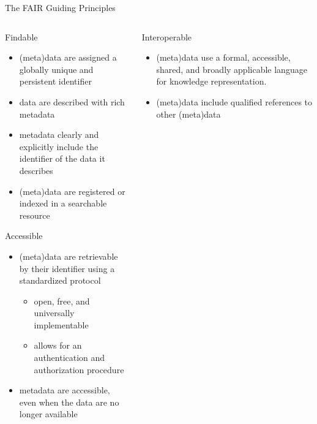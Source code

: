 \documentclass[ignorenonframetext,aspectratio=169,10pt,xcolor=table]{beamer}
\begin{document}
\begin{frame}{The FAIR Guiding Principles}
  \begin{columns} \small
    \begin{column}{0.5\textwidth}
  \begin{block}{Findable}
    \begin{itemize}
    \item (meta)data are assigned a globally unique and persistent identifier
    \item data are described with rich metadata 
    \item metadata clearly and explicitly include the identifier of the data it describes
    \item (meta)data are registered or indexed in a searchable resource
    \end{itemize}
  \end{block}

  \begin{block}{Accessible}
    \begin{itemize}
    \item (meta)data are retrievable by their identifier using a standardized protocol
      \begin{itemize}
      \item  open, free, and universally implementable
      \item  allows for an authentication and authorization procedure
      \end{itemize}
    \item metadata are accessible, even when the data are no longer available
    \end{itemize}
  \end{block}
\end{column}
  \begin{column}{0.5\textwidth}
  \begin{block}{Interoperable}
    \begin{itemize}
    \item (meta)data use a formal, accessible, shared, and broadly applicable language for knowledge representation.
    \item (meta)data include qualified references to other (meta)data
    \end{itemize}
  \end{block}


\end{column}
\end{columns}
\end{frame}
\end{document}
